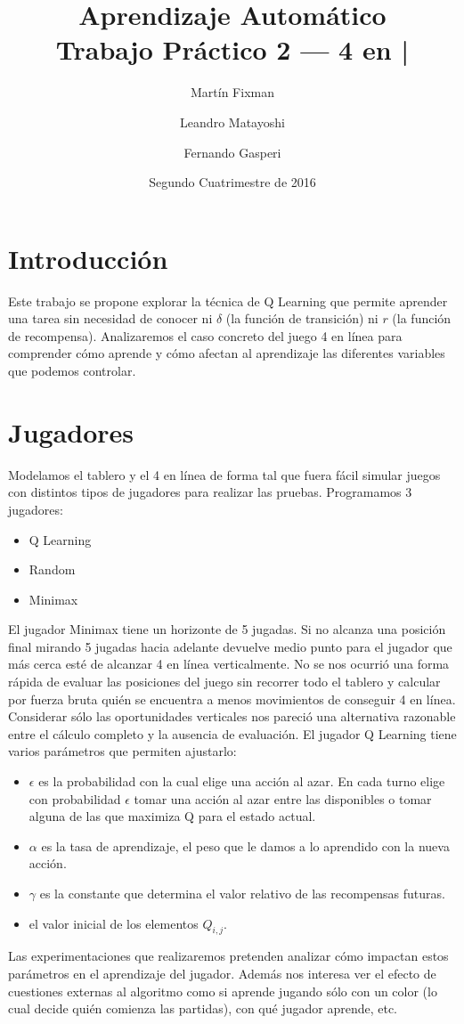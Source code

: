 \documentclass{article}
\title{Aprendizaje Automático \\ Trabajo Práctico 2 --- 4 en |}
\author{Martín Fixman \and Leandro Matayoshi \and Fernando Gasperi}
\date{Segundo Cuatrimestre de 2016}
\begin{document}
\maketitle

\newpage

\section{Introducción}

Este trabajo se propone explorar la técnica de Q Learning que permite aprender una tarea
sin necesidad de conocer ni $\delta$ (la función de transición) ni $r$ (la función de recompensa).
Analizaremos el caso concreto del juego 4 en línea para comprender cómo aprende y cómo afectan
al aprendizaje las diferentes variables que podemos controlar.

\section{Jugadores}

Modelamos el tablero y el 4 en línea de forma tal que fuera fácil simular juegos con distintos tipos de jugadores para
realizar las pruebas. Programamos 3 jugadores:
\begin{itemize}
  \item Q Learning
  \item Random
  \item Minimax
\end{itemize}
El jugador Minimax tiene un horizonte de 5 jugadas. Si no alcanza una posición final mirando 5 jugadas
hacia adelante devuelve medio punto para el jugador que más cerca esté de alcanzar 4 en línea verticalmente.
No se nos ocurrió una forma rápida de evaluar las posiciones del juego sin recorrer todo el tablero y calcular
por fuerza bruta quién se encuentra a menos movimientos de conseguir 4 en línea. Considerar sólo las oportunidades
verticales nos pareció una alternativa razonable entre el cálculo completo y la ausencia de evaluación.
El jugador Q Learning tiene varios parámetros que permiten ajustarlo:
\begin{itemize}
  \item $\epsilon$ es la probabilidad con la cual elige una acción al azar. En
    cada turno elige con probabilidad $\epsilon$ tomar una acción al azar entre
    las disponibles o tomar alguna de las que maximiza Q para el estado actual.
  \item $\alpha$ es la tasa de aprendizaje, el peso que le damos a lo aprendido
    con la nueva acción.
  \item $\gamma$ es la constante que determina el valor relativo de las
    recompensas futuras.
  \item el valor inicial de los elementos $Q_{i, j}$.
\end{itemize}
Las experimentaciones que realizaremos pretenden analizar cómo impactan estos
parámetros en el aprendizaje del jugador. Además nos interesa ver el efecto de
cuestiones externas al algoritmo como si aprende jugando sólo con un color (lo
cual decide quién comienza las partidas), con qué jugador aprende, etc.
\end{document}
